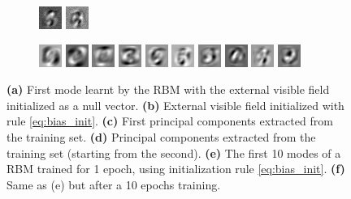 \documentclass[notitlepage]{revtex4-1}
\begin{document}
\begin{figure}
\begin{subfigure}{\linewidth}
    \includegraphics[width=.05\linewidth]{W_l_eigv_9.png}
    \includegraphics[width=.05\linewidth]{W_l_eigv_10.png}
    \caption{}
    \label{fig:modes_tr}
  \end{subfigure}\par
  \begin{subfigure}{\linewidth}
    \includegraphics[width=.05\linewidth]{W_10_l_eigv_1.png}
    \includegraphics[width=.05\linewidth]{W_10_l_eigv_2.png}
    \includegraphics[width=.05\linewidth]{W_10_l_eigv_3.png}
    \includegraphics[width=.05\linewidth]{W_10_l_eigv_4.png}
    \includegraphics[width=.05\linewidth]{W_10_l_eigv_5.png}
    \includegraphics[width=.05\linewidth]{W_10_l_eigv_6.png}
    \includegraphics[width=.05\linewidth]{W_10_l_eigv_7.png}
    \includegraphics[width=.05\linewidth]{W_10_l_eigv_8.png}
    \includegraphics[width=.05\linewidth]{W_10_l_eigv_9.png}
    \includegraphics[width=.05\linewidth]{W_10_l_eigv_10.png}
    \caption{}
    \label{fig:modes_tr_10}
  \end{subfigure}
   \caption{\textbf{(a)} First mode learnt by the RBM with the external visible field initialized as a null vector. \textbf{(b)} External visible field initialized with rule \eqref{eq:bias_init}. \textbf{(c)} First principal components extracted from the training set. \textbf{(d)} Principal components extracted from the training set (starting from the second). \textbf{(e)} The first 10 modes of a RBM trained for 1 epoch, using initialization rule \eqref{eq:bias_init}. \textbf{(f)} Same as (e) but after a 10 epochs training.}
\end{figure}
\end{document}
